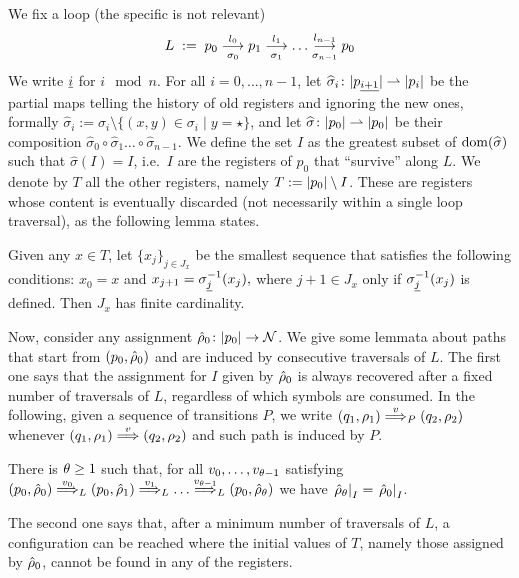 We fix a loop (the specific \hdma{} is not relevant)
\[
	L \;:=\; p_0 \overset{l_0}{\underset{\sigma_0}{\longrightarrow}} p_1 \overset{l_1}{\underset{\sigma_1}{\longrightarrow}} \dots \overset{l_{n-1}}{\underset{\sigma_{n-1}}{\longrightarrow}} p_0
\]
We write ${\underline{i}}$ for $i \mod n$. 
For all $i=0,\dots,n-1$, let $\widehat{\sigma}_i \colon |p_{\underline{i+1}}| \rightharpoonup |p_i|$ be the partial maps telling the history of old registers and ignoring the new ones, formally $\widehat{\sigma}_i := \sigma_i \setminus \{ (x,y) \in \sigma_i \mid y = \star \}$, and let $\widehat{\sigma} \colon |p_0| \rightharpoonup |p_0|$ be their composition $\widehat{\sigma}_0 \circ \widehat{\sigma}_1 \dots \circ \widehat{\sigma}_{n-1}$. We define the set $I$ as the greatest subset of $\operatorname{dom}(\widehat{\sigma})$ such that $ \widehat{\sigma}(I) = I$,
i.e.\ $I$ are the registers of $p_0$ that ``survive'' along $L$. We denote by $T$ all the other registers, namely $T := |p_0| \setminus I$. These are registers whose content is eventually discarded (not necessarily within a single loop traversal), as the following lemma states.
%
%
\begin{lemma}
\label{lem:rho-forget}
Given any $x \in T$, let $\{x_j\}_{j \in J_x}$ be the smallest sequence that satisfies the following conditions:
$
	x_0 = x
$
and
$
	x_{j+1} = \sigma_{{\underline{j}}}^{-1}(x_j),
$
where $j+1 \in J_x$ only if $\sigma_{{\underline{j}}}^{-1}(x_j)$ is defined. Then $J_x$ has finite cardinality.
\end{lemma}
%
Now, consider any assignment $\hat{\rho}_0 \colon |p_0| \to \mathcal{N}$. We give some lemmata about paths that start from $(p_0,\hat{\rho}_0)$ and are induced by consecutive traversals of $L$. The first one says that the assignment for $I$ given by $\hat{\rho}_0$ is always recovered after a fixed number of traversals of $L$, regardless of which symbols are consumed. In the following, given a sequence of transitions $P$, we write $(q_1,\rho_1) \overset{v}{\Longrightarrow}_{P} (q_2,\rho_2)$ whenever $(q_1,\rho_1) \overset{v}{\Longrightarrow} (q_2,\rho_2)$ and such path is induced by $P$.
%
\begin{lemma} 
\label{lem:idI}
There is $\theta \geq 1$ such that, for all $v_0,\dots,v_{\theta-1}$ satisfying $(p_0,\hat{\rho}_0) \overset{v_0}{\Longrightarrow}_{L} (p_0,\hat{\rho}_1) \overset{v_1}{\Longrightarrow}_{L} \dots \overset{v_{\theta-1}}{\Longrightarrow}_{L} (p_0,\hat{\rho}_\theta)$ we have $\left. \hat{\rho}_\theta \right|_{I} = \left. \hat{\rho}_0 \right|_{I}$.
\end{lemma}
%
The second one says that, after a minimum number of traversals of $L$, a configuration can be reached where the initial values of $T$, namely those assigned by $\hat{\rho}_0$, cannot be found in any of the registers.
